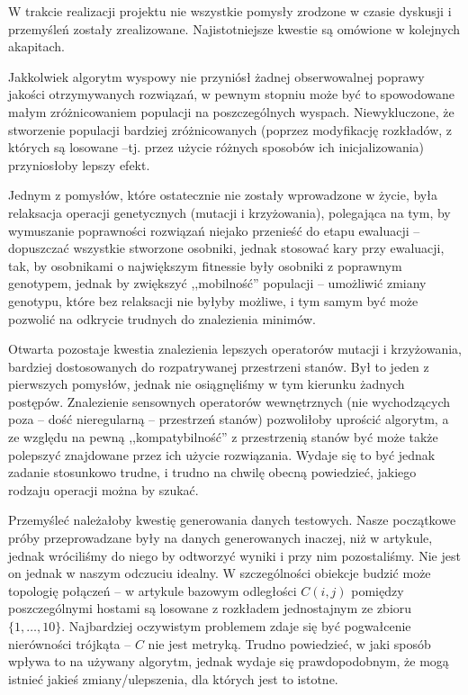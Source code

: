 \documentclass[11pt,pdftex,a4paper]{scrartcl}
\begin{document}
W trakcie realizacji projektu nie wszystkie pomysły zrodzone w czasie dyskusji i przemyśleń zostały
zrealizowane. Najistotniejsze kwestie są omówione w kolejnych akapitach.

Jakkolwiek algorytm wyspowy nie przyniósł żadnej obserwowalnej poprawy jakości otrzymywanych rozwiązań,
w pewnym stopniu może być to spowodowane małym zróżnicowaniem populacji na poszczególnych wyspach.
Niewykluczone, że stworzenie populacji bardziej zróżnicowanych (poprzez modyfikację rozkładów, z których
są losowane --tj. przez użycie różnych sposobów ich inicjalizowania) przyniosłoby lepszy efekt.

Jednym z pomysłów, które ostatecznie nie zostały wprowadzone w życie, była relaksacja operacji
genetycznych (mutacji i krzyżowania), polegająca na tym, by wymuszanie poprawności rozwiązań niejako
przenieść do etapu ewaluacji -- dopuszczać wszystkie stworzone osobniki, jednak stosować kary przy
ewaluacji, tak, by osobnikami o największym fitnessie były osobniki z poprawnym genotypem, jednak by
zwiększyć ,,mobilność'' populacji -- umożliwić zmiany genotypu, które bez relaksacji nie byłyby 
możliwe, i tym samym być może pozwolić na odkrycie trudnych do znalezienia minimów.

Otwarta pozostaje kwestia znalezienia lepszych operatorów mutacji i krzyżowania, bardziej dostosowanych
do rozpatrywanej przestrzeni stanów. Był to jeden z pierwszych pomysłów, jednak nie osiągnęliśmy w tym
kierunku żadnych postępów. Znalezienie sensownych operatorów wewnętrznych (nie wychodzących poza --
dość nieregularną -- przestrzeń stanów) pozwoliłoby uprościć algorytm, a ze względu na pewną 
,,kompatybilność'' z przestrzenią stanów być może także polepszyć znajdowane przez ich użycie 
rozwiązania. Wydaje się to być jednak zadanie stosunkowo trudne, i trudno na chwilę obecną powiedzieć,
jakiego rodzaju operacji można by szukać.

Przemyśleć należałoby kwestię generowania danych testowych. Nasze początkowe próby przeprowadzane
były na danych generowanych inaczej, niż w artykule, jednak wróciliśmy do niego by odtworzyć wyniki
i przy nim pozostaliśmy. Nie jest on jednak w naszym odczuciu idealny. W szczególności obiekcje 
budzić może topologię połączeń -- w artykule bazowym odległości \(C(i,j)\) pomiędzy poszczególnymi
hostami są losowane z rozkładem jednostajnym ze zbioru \(\{1,\ldots,10\}\). Najbardziej oczywistym
problemem zdaje się być pogwałcenie nierówności trójkąta -- \(C\) nie jest metryką. Trudno powiedzieć,
w jaki sposób wpływa to na używany algorytm, jednak wydaje się prawdopodobnym, że mogą istnieć jakieś
zmiany/ulepszenia, dla których jest to istotne. 
\end{document}
